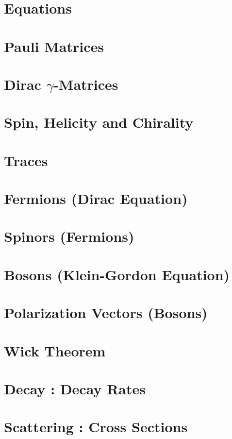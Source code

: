 \documentclass[landscape,8pt,a4paper,english]{extarticle}
\begin{document}
\begin{multicols*}{3}\centering
        \section*{Equations}
        \section*{Pauli Matrices}
        \section*{Dirac $\gamma$-Matrices}
        \section*{Spin, Helicity and Chirality}
        \section*{Traces}
        \section*{Fermions (Dirac Equation)}
        \section*{Spinors (Fermions)}
        \section*{Bosons (Klein-Gordon Equation)}
        \section*{Polarization Vectors (Bosons)}
        \section*{Wick Theorem}
        \section*{Decay : Decay Rates}
        \section*{Scattering : Cross Sections}

\end{multicols*}
\end{document}

